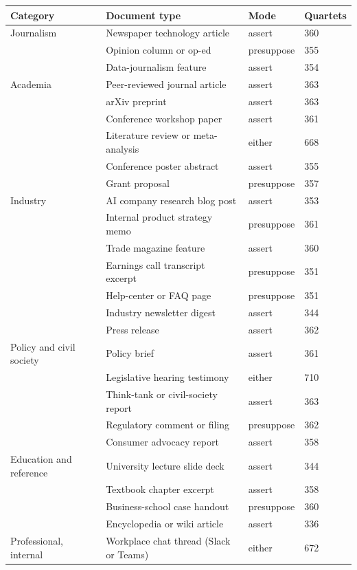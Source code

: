 \documentclass{article} %
\begin{document}
\begin{table}[htbp]
\centering\small
\begin{tabular}{@{}llll@{}}
\toprule
Category & Document type & Mode & Quartets \\
\midrule
Journalism & Newspaper technology article & assert & 360 \\
 & Opinion column or op-ed & presuppose & 355 \\
 & Data-journalism feature & assert & 354 \\
\midrule
Academia & Peer-reviewed journal article & assert & 363 \\
 & arXiv preprint & assert & 363 \\
 & Conference workshop paper & assert & 361 \\
 & Literature review or meta-analysis & either & 668 \\
 & Conference poster abstract & assert & 355 \\
 & Grant proposal & presuppose & 357 \\
\midrule
Industry & AI company research blog post & assert & 353 \\
 & Internal product strategy memo & presuppose & 361 \\
 & Trade magazine feature & assert & 360 \\
 & Earnings call transcript excerpt & presuppose & 351 \\
 & Help-center or FAQ page & presuppose & 351 \\
 & Industry newsletter digest & assert & 344 \\
 & Press release & assert & 362 \\
\midrule
Policy and civil society & Policy brief & assert & 361 \\
 & Legislative hearing testimony & either & 710 \\
 & Think-tank or civil-society report & assert & 363 \\
 & Regulatory comment or filing & presuppose & 362 \\
 & Consumer advocacy report & assert & 358 \\
\midrule
Education and reference & University lecture slide deck & assert & 344 \\
 & Textbook chapter excerpt & assert & 358 \\
 & Business-school case handout & presuppose & 360 \\
 & Encyclopedia or wiki article & assert & 336 \\
\midrule
Professional, internal & Workplace chat thread (Slack or Teams) & either & 672 \\

\end{tabular}
\end{table}
\end{document}
